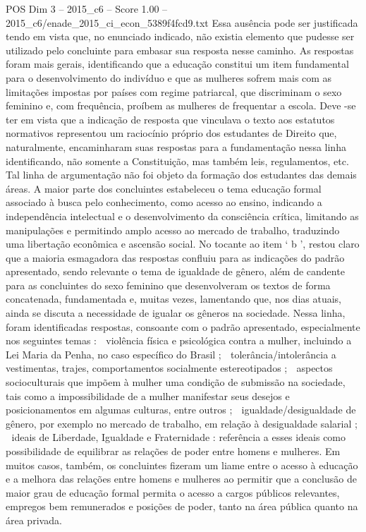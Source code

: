 \begin{textsample}{POS Dim 3 – 2015\_c6 – Score 1.00 – 2015\_c6/enade\_2015\_ci\_econ\_5389f4fcd9.txt}
Essa ausência pode ser justificada tendo em vista que, no enunciado indicado, não existia elemento que pudesse ser utilizado pelo concluinte para embasar sua resposta nesse caminho.
As respostas foram mais gerais, identificando que a educação constitui um item fundamental para o desenvolvimento do indivíduo e que as mulheres sofrem mais com as limitações impostas por países com regime patriarcal, que discriminam o sexo feminino e, com frequência, proíbem as mulheres de frequentar a escola.
Deve -se ter em vista que a indicação de resposta que vinculava o texto aos estatutos normativos representou um raciocínio próprio dos estudantes de Direito que, naturalmente, encaminharam suas respostas para a fundamentação nessa linha identificando, não somente a Constituição, mas também leis, regulamentos, etc.
Tal linha de argumentação não foi objeto da formação dos estudantes das demais áreas.
A maior parte dos concluintes estabeleceu o tema educação formal associado à busca pelo conhecimento, como acesso ao ensino, indicando a independência intelectual e o desenvolvimento da consciência crítica, limitando as manipulações e permitindo amplo acesso ao mercado de trabalho, traduzindo uma libertação econômica e ascensão social.
No tocante ao item ‘ b ’, restou claro que a maioria esmagadora das respostas confluiu para as indicações do padrão apresentado, sendo relevante o tema de igualdade de gênero, além de candente para as concluintes do sexo feminino que desenvolveram os textos de forma concatenada, fundamentada e, muitas vezes, lamentando que, nos dias atuais, ainda se discuta a necessidade de igualar os gêneros na sociedade.
Nessa linha, foram identificadas respostas, consoante com o padrão apresentado, especialmente nos seguintes temas :  violência física e psicológica contra a mulher, incluindo a Lei Maria da Penha, no caso específico do Brasil ;  tolerância/intolerância a vestimentas, trajes, comportamentos socialmente estereotipados ;  aspectos socioculturais que impõem à mulher uma condição de submissão na sociedade, tais como a impossibilidade de a mulher manifestar seus desejos e posicionamentos em algumas culturas, entre outros ;  igualdade/desigualdade de gênero, por exemplo no mercado de trabalho, em relação à desigualdade salarial ;  ideais de Liberdade, Igualdade e Fraternidade : referência a esses ideais como possibilidade de equilibrar as relações de poder entre homens e mulheres.
Em muitos casos, também, os concluintes fizeram um liame entre o acesso à educação e a melhora das relações entre homens e mulheres ao permitir que a conclusão de maior grau de educação formal permita o acesso a cargos públicos relevantes, empregos bem remunerados e posições de poder, tanto na área pública quanto na área privada.

\end{textsample}
